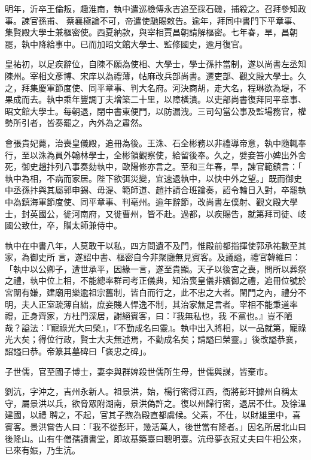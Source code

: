 \begin{pinyinscope}
 明年，沂卒王倫叛，趣淮南，執中遣巡檢傅永吉追至採石磯，捕殺之。召拜參知政事。諫官孫甫、
 蔡襄極論不可，帝遣使馳賜敕告。逾年，拜同中書門下平章事、集賢殿大學士兼樞密使。西夏納款，與宰相賈昌朝請解樞密。七年春，旱，昌朝罷，執中降給事中。已而加昭文館大學士、監修國史，逾月復官。



 皇祐初，以足疾辭位，自陳不願為使相、大學士，學士孫抃當制，遂以尚書左丞知陳州。宰相文彥博、宋庠以為禮薄，帖麻改兵部尚書。遷吏部、觀文殿大學士。久之，拜集慶軍節度使、同平章事、判大名府。河決商胡，走大名，程琳欲為堤，不
 果成而去。執中乘年豐調丁夫增築二十里，以障橫潰。以吏部尚書復拜同平章事、昭文館大學士。每朝退，閉中書東便門，以防漏洩。三司勾當公事及監場務官，權勢所引者，皆奏罷之，內外為之肅然。



 會張貴妃薨，治喪皇儀殿，追冊為後。王洙、石全彬務以非禮導帝意，執中隨輒奉行，至以洙為員外翰林學士，全彬領觀察使，給留後奉。久之，嬖妾笞小婢出外舍死，御史趙抃列八事奏劾執中，歐陽修亦言之。至和三年春，旱，諫官範鎮言：「
 執中為相，不病而家居。陛下欲弭災變，宜速退執中，以快中外之望。」既而御史中丞孫抃與其屬郭申錫、毋湜、範師道、趙抃請合班論奏，詔令輪日入對，卒罷執中為鎮海軍節度使、同平章事、判亳州。逾年辭節，改尚書左僕射、觀文殿大學士，封英國公，徙河南府，又徙曹州，皆不赴。過都，以疾賜告，就第拜司徒、岐國公致仕，卒，贈太師兼侍中。



 執中在中書八年，人莫敢干以私，四方問遺不及門，惟殿前都指揮使郭承祐數至其家，為御史所
 言，遂詔中書、樞密自今非聚廳無見賓客。及議謚，禮官韓維曰：「執中以公卿子，遭世承平，因緣一言，遂至貴顯。天子以後宮之喪，問所以葬祭之禮，執中位上相，不能總率群司考正儀典，知治喪皇儀非嬪御之禮，追冊位號於宮闈有嫌，建廟用樂逾祖宗舊制，皆白而行之，此不忠之大者。閨門之內，禮分不明，夫人正室疏薄自絀，庶妾賤人悍逸不制，其治家無足言者。宰相不能秉道率禮，正身齊家，方杜門深居，謝絕賓客，曰：『我無私也，我
 不黨也。』豈不陋哉？謚法：『寵祿光大曰榮』，『不勤成名曰靈』。執中出入將相，以一品就第，寵祿光大矣；得位行政，賢士大夫無述焉，不勤成名矣；請謚曰榮靈。」後改謚恭襄，詔謚曰恭。帝篆其墓碑曰「褒忠之碑」。



 子世儒，官至國子博士，妻李與群婢殺世儒所生母，世儒與謀，皆棄市。



 劉沆，字沖之，吉州永新人。祖景洪，始，楊行密得江西，衙將彭玕據州自稱太守，屬景洪以兵，欲脅眾附湖南，景洪偽許之。復以州歸行密，退居不仕。及徐溫建國，以禮
 聘之，不起，官其子煦為殿直都虞候。父素，不仕，以財雄里中，喜賓客。景洪嘗告人曰：「我不從彭玕，幾活萬人，後世當有隆者。」因名所居北山曰後隆山。山有牛僧孺讀書堂，即故基築臺曰聰明臺。沆母夢衣冠丈夫曰牛相公來，已來有娠，乃生沆。




\end{pinyinscope}
